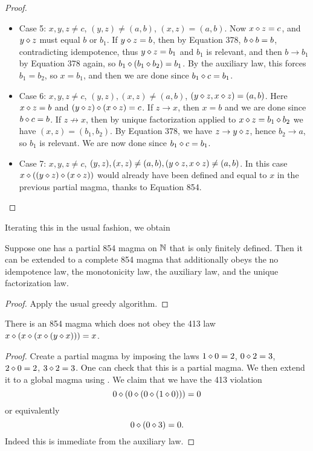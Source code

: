 \begin{proof}
\begin{itemize}
  \item Case 5: $x,y,z \neq c$, $(y,z) \neq (a,b)$, $(x,z) = (a,b)$.  Now $x \diamond z = c$, and $y \diamond z$ must equal $b$ or $b_1$.  If $y \diamond z = b$, then by Equation 378, $b \diamond b = b$, contradicting idempotence, thus $y \diamond z = b_1$ and $b_1$ is relevant, and then $b \to b_1$ by Equation 378 again, so $b_1 \diamond (b_1 \diamond b_2) = b_1$.  By the auxiliary law, this forces $b_1 = b_2$, so $x = b_1$, and then we are done since $b_1 \diamond c = b_1$.
  \item Case 6: $x,y,z \neq c$, $(y,z), (x,z) \neq (a,b)$, $(y \diamond z, x \diamond z) = (a,b)$.  Here $x \diamond z = b$ and $(y \diamond z) \diamond (x \diamond z) = c$.  If $z \to x$, then $x=b$ and we are done since $b \diamond c = b$.  If $z \not \to x$, then by unique factorization applied to $x \diamond z = b_1 \diamond b_2$ we have $(x,z) = (b_1,b_2)$.  By Equation 378, we have $z \to y \diamond z$, hence $b_2 \to a$, so $b_1$ is relevant.  We are now done since $b_1 \diamond c = b_1$.
  \item Case 7: $x,y,z \neq c$, $(y,z), (x,z) \neq (a,b), (y \diamond z, x \diamond z) \neq (a,b)$.  In this case $x \diamond ((y \diamond z) \diamond (x \diamond z))$ would already have been defined and equal to $x$ in the previous partial magma, thanks to Equation 854.
\end{itemize}
\end{proof}

Iterating this in the usual fashion, we obtain

\begin{corollary}[854 extension]\label{extend-854}\leanok{}
Suppose one has a partial 854 magma on $\mathbb{N}$ that is only finitely defined.  Then it can be extended to a complete 854 magma that additionally obeys the no idempotence law, the monotonicity law, the auxiliary law, and the unique factorization law.
\end{corollary}

\begin{proof}  Apply the usual greedy algorithm.
\end{proof}

\begin{corollary}  There is an 854 magma which does not obey the 413 law $x \diamond (x \diamond (x \diamond (y \diamond x))) = x$.
\end{corollary}

\begin{proof} Create a partial magma by imposing the laws $1 \diamond 0 = 2$, $0 \diamond 2 = 3$, $2 \diamond 0 = 2$, $3 \diamond 2 = 3$.  One can check that this is a partial magma.  We then extend it to a global magma using .  We claim that we have the 413 violation
  $$ 0 \diamond (0 \diamond (0 \diamond (1 \diamond 0))) = 0$$
  or equivalently
  $$ 0 \diamond (0 \diamond 3) = 0.$$
Indeed this is immediate from the auxiliary law.
\end{proof}
